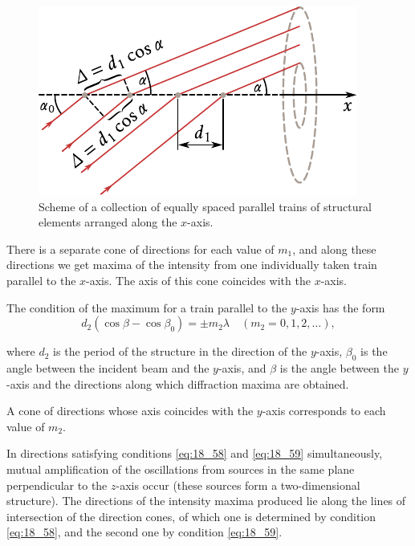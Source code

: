 \begin{figure}[t]
	\begin{center}
		\includegraphics[scale=1.0]{figures/ch_18/fig_18_41.pdf}
        \caption[]{Scheme of a collection of equally spaced parallel trains of structural elements arranged along the $x$-axis.}
		\label{fig:18_41}
	\end{center}
	\vspace{-0.8cm}
\end{figure}

There is a separate cone of directions for each value of $m_1$, and along these directions we get maxima of the intensity from one individually taken train parallel to the $x$-axis.
The axis of this cone coincides with the $x$-axis.

The condition of the maximum for a train parallel to the $y$-axis has the form
\begin{equation}\label{eq:18_59}
	d_2 (\cos\beta - \cos\beta_0) = \pm m_2 \lambda \quad (m_2=0,1,2,\ldots),
\end{equation}

\noindent
where $d_2$ is the period of the structure in the direction of the $y$-axis, $\beta_0$ is the angle between the incident beam and the $y$-axis, and $\beta$ is the angle between the $y$-axis and the directions along which diffraction maxima are obtained.

A cone of directions whose axis coincides with the $y$-axis corresponds to each value of $m_2$.

In directions satisfying conditions \eqref{eq:18_58} and \eqref{eq:18_59} simultaneously, mutual amplification of the oscillations from sources in the same plane perpendicular to the $z$-axis occur (these sources form a two-dimensional structure).
The directions of the intensity maxima produced lie along the lines of intersection of the direction cones, of which one is determined by condition \eqref{eq:18_58}, and the second one by condition \eqref{eq:18_59}.

